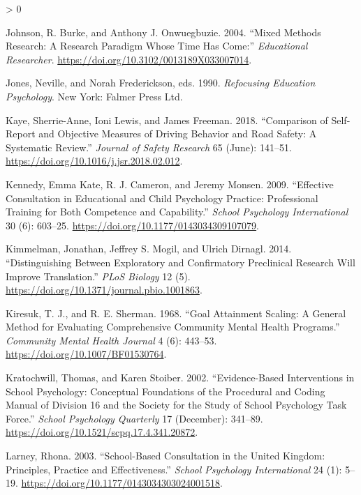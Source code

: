 \documentclass[
]{article}
\newlength{\cslhangindent}
\newenvironment{CSLReferences}[2] %
 {%
  \setlength{\parindent}{0pt}
  \ifodd #1 \everypar{\setlength{\hangindent}{\cslhangindent}}\ignorespaces\fi
  \ifnum #2 > 0
  \setlength{\parskip}{#2\baselineskip}
  \fi
 }%
 {}
\begin{document}
\begin{CSLReferences}{1}{0}
\leavevmode\hypertarget{ref-johnsonMixedMethodsResearch2004a}{}%
Johnson, R. Burke, and Anthony J. Onwuegbuzie. 2004. {``Mixed {Methods
Research}: {A Research Paradigm Whose Time Has Come}:''}
\emph{Educational Researcher}.
\url{https://doi.org/10.3102/0013189X033007014}.

\leavevmode\hypertarget{ref-jonesRefocusingEducationPsychology1990}{}%
Jones, Neville, and Norah Frederickson, eds. 1990. \emph{Refocusing
{Education Psychology}}. {New York}: {Falmer Press Ltd}.

\leavevmode\hypertarget{ref-kayeComparisonSelfreportObjective2018}{}%
Kaye, Sherrie-Anne, Ioni Lewis, and James Freeman. 2018. {``Comparison
of Self-Report and Objective Measures of Driving Behavior and Road
Safety: {A} Systematic Review.''} \emph{Journal of Safety Research} 65
(June): 141--51. \url{https://doi.org/10.1016/j.jsr.2018.02.012}.

\leavevmode\hypertarget{ref-kennedyEffectiveConsultationEducational2009a}{}%
Kennedy, Emma Kate, R. J. Cameron, and Jeremy Monsen. 2009. {``Effective
{Consultation} in {Educational} and {Child Psychology Practice}:
{Professional Training} for {Both Competence} and {Capability}.''}
\emph{School Psychology International} 30 (6): 603--25.
\url{https://doi.org/10.1177/0143034309107079}.

\leavevmode\hypertarget{ref-kimmelmanDistinguishingExploratoryConfirmatory2014}{}%
Kimmelman, Jonathan, Jeffrey S. Mogil, and Ulrich Dirnagl. 2014.
{``Distinguishing Between {Exploratory} and {Confirmatory Preclinical
Research Will Improve Translation}.''} \emph{PLoS Biology} 12 (5).
\url{https://doi.org/10.1371/journal.pbio.1001863}.

\leavevmode\hypertarget{ref-kiresukGoalAttainmentScaling1968}{}%
Kiresuk, T. J., and R. E. Sherman. 1968. {``Goal Attainment Scaling: {A}
General Method for Evaluating Comprehensive Community Mental Health
Programs.''} \emph{Community Mental Health Journal} 4 (6): 443--53.
\url{https://doi.org/10.1007/BF01530764}.

\leavevmode\hypertarget{ref-kratochwillEvidenceBasedInterventionsSchool2002}{}%
Kratochwill, Thomas, and Karen Stoiber. 2002. {``Evidence-{Based
Interventions} in {School Psychology}: {Conceptual Foundations} of the
{Procedural} and {Coding Manual} of {Division} 16 and the {Society} for
the {Study} of {School Psychology Task Force}.''} \emph{School
Psychology Quarterly} 17 (December): 341--89.
\url{https://doi.org/10.1521/scpq.17.4.341.20872}.

\leavevmode\hypertarget{ref-larneySchoolBasedConsultationUnited2003}{}%
Larney, Rhona. 2003. {``School-{Based Consultation} in the {United
Kingdom}: {Principles}, {Practice} and {Effectiveness}.''} \emph{School
Psychology International} 24 (1): 5--19.
\url{https://doi.org/10.1177/0143034303024001518}.


\end{CSLReferences}
\end{document}
